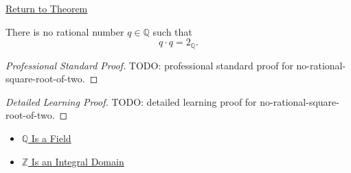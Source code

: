 \newpage
{}
\label{prf:no-rational-square-root-of-two}

\begin{remark*}[Return]
\hyperref[thm:no-rational-square-root-of-two]{Return to Theorem}
\end{remark*}

\begin{theorem*}
There is no rational number $q\in\mathbb{Q}$ such that
\[
q\cdot q=2_{\mathbb{Q}}.
\]
\end{theorem*}

\begin{proof}[Professional Standard Proof]
\LRAProofBodyStart
TODO: professional standard proof for no-rational-square-root-of-two.
\end{proof}

\begin{proof}[Detailed Learning Proof]
\LRAProofBodyStart
TODO: detailed learning proof for no-rational-square-root-of-two.
\end{proof}

\begin{remark*}
\end{remark*}

\begin{dependencies}
\begin{itemize}
  \item \hyperref[thm:q-is-a-field]{$\mathbb{Q}$ Is a Field}
  \item \hyperref[thm:z-integral-domain]{$\mathbb{Z}$ Is an Integral Domain}
\end{itemize}
\end{dependencies}

\clearpage
